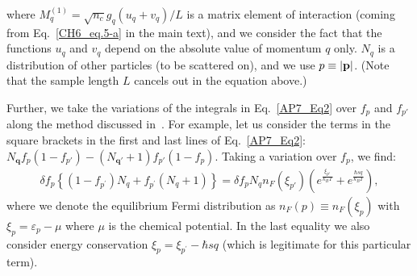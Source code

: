 %
where $M^{(1)}_q=\sqrt{n_c}g_q(u_q+v_q)/L$ is a matrix element of interaction (coming from Eq.~\eqref{CH6_eq.5-a} in the main text), and we consider the fact that the functions $u_q$ and $v_q$ depend on the absolute value of momentum $q$ only.
$N_q$ is a distribution of other particles (to be scattered on), and we use $p\equiv\abs{\mathbf{p}}$.
(Note that the sample length $L$ cancels out in the equation above.)

Further, we take the variations of the integrals in Eq.~\eqref{AP7_Eq2} over $f_p$ and $f_{p'}$ along the method discussed in~\cite{Zaitsev:2014aa}.
For example, let us consider the terms in the square brackets in the first and last lines of Eq.~\eqref{AP7_Eq2}: $N_{\textbf{q}}f_p(1-f_{p'})-(N_{\textbf{q}'}+1)f_{p'}(1-f_{p})$.
Taking a variation over $f_p$, we find:
%
\begin{eqnarray}
\label{EqBol1}
\delta f_p\left\{(1-f_{p^\prime})N_q
+f_{p^\prime}(N_{q}+1)\right\}
=
\delta f_pN_qn_F(\xi_{p'})
    \left(
e^{\frac{\xi_{p'}}{k_BT}}
+e^{\frac{\hbar sq}{k_BT}}
    \right)
,
\end{eqnarray}
%
where we denote the equilibrium Fermi distribution as $n_F(p)\equiv n_F(\xi_p)$ with $\xi_p=\varepsilon_p-\mu$ where $\mu$ is the chemical potential.
In the last equality we also consider energy conservation $\xi_{p}=\xi_{p^{\prime}}-\hbar sq$ (which is legitimate for this particular term).

